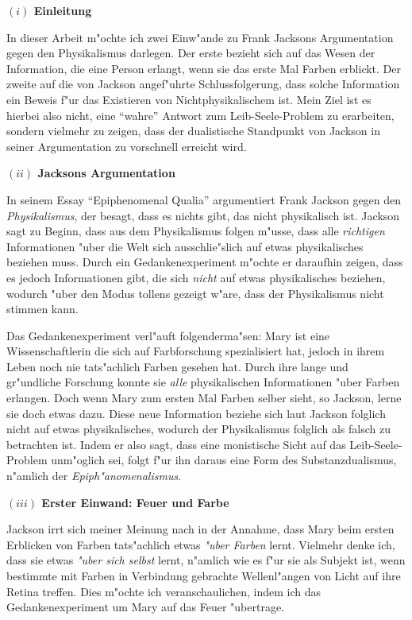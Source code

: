 \documentclass[a4paper, emulatestandardclasses, 12pt]{scrartcl}
\begin{document}
\begin{onehalfspace} 


\noindent\textbf{$(i)$ Einleitung}

\noindent In dieser Arbeit m"ochte ich zwei Einw"ande zu Frank Jacksons Argumentation gegen den Physikalismus darlegen. Der erste bezieht sich auf das Wesen der Information, die eine Person erlangt, wenn sie das erste Mal Farben erblickt. Der zweite auf die von Jackson angef"uhrte Schlussfolgerung, dass solche Information ein Beweis f"ur das Existieren von Nichtphysikalischem ist. Mein Ziel ist es hierbei also nicht, eine "`wahre"' Antwort zum Leib-Seele-Problem zu erarbeiten, sondern vielmehr zu zeigen, dass der dualistische Standpunkt von Jackson in seiner Argumentation zu vorschnell erreicht wird.
\vspace{5mm}

\noindent\textbf{$(ii)$ Jacksons Argumentation}

\noindent In seinem Essay "`Epiphenomenal Qualia"' \citep{jackson1982epiphenomenal} argumentiert Frank Jackson gegen den \emph{Physikalismus}, der besagt, dass es nichts gibt, das nicht physikalisch ist. Jackson sagt zu Beginn, dass aus dem Physikalismus folgen m"usse, dass alle \emph{richtigen} Informationen "uber die Welt sich ausschlie"slich auf etwas physikalisches beziehen muss. Durch ein Gedankenexperiment m"ochte er daraufhin zeigen, dass es jedoch Informationen gibt, die sich \emph{nicht} auf etwas physikalisches beziehen, wodurch "uber den Modus tollens gezeigt w"are, dass der Physikalismus nicht stimmen kann. 

Das Gedankenexperiment verl"auft folgenderma"sen: Mary ist eine Wissenschaftlerin die sich auf Farbforschung spezialisiert hat, jedoch in ihrem Leben noch nie tats"achlich Farben gesehen hat. Durch ihre lange und gr"undliche Forschung konnte sie \emph{alle} physikalischen Informationen "uber Farben erlangen. Doch wenn Mary zum ersten Mal Farben selber sieht, so Jackson, lerne sie doch etwas dazu. Diese neue Information beziehe sich laut Jackson folglich nicht auf etwas physikalisches, wodurch der Physikalismus folglich als falsch zu betrachten ist. Indem er also sagt, dass eine monistische Sicht auf das Leib-Seele-Problem unm"oglich sei, folgt f"ur ihn daraus eine Form des Substanzdualismus, n"amlich der  \emph{Epiph"anomenalismus}.


\vspace{5mm}
\noindent\textbf{$(iii)$ Erster Einwand: Feuer und Farbe}

\noindent Jackson irrt sich meiner Meinung nach in der Annahme, dass Mary beim ersten Erblicken von Farben tats"achlich etwas \emph{"uber Farben} lernt. Vielmehr denke ich, dass sie etwas \emph{"uber sich selbst} lernt, n"amlich wie es f"ur sie als Subjekt ist, wenn bestimmte mit Farben in Verbindung gebrachte Wellenl"angen von Licht auf ihre Retina treffen. Dies m"ochte ich veranschaulichen, indem ich das Gedankenexperiment um Mary auf das Feuer "ubertrage. 


\end{onehalfspace}
\end{document}
